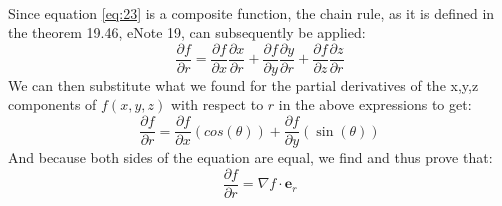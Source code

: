 \documentclass{article}
\begin{document}
\\
Since equation \ref{eq:23} is a composite function, the chain rule, as it is defined in the theorem 19.46, eNote 19, can subsequently be applied:
\begin{equation}
\frac{\partial f}{\partial r} = \frac{\partial f}{\partial x}\frac{\partial x}{\partial r}+\frac{\partial f}{\partial y}\frac{\partial y}{\partial r}+\frac{\partial f}{\partial z}\frac{\partial z}{\partial r}
\end{equation}
We can then substitute what we found for the partial derivatives of the x,y,z components of $f(x,y,z)$ with respect to $r$ in the above expressions to get: 
\begin{equation}
    \frac{\partial f}{\partial r} = \frac{\partial f}{\partial x}(cos(\theta))+\frac{\partial f}{\partial y}(\sin(\theta))
\end{equation}
And because both sides of the equation are equal, we find and thus prove that:
\begin{equation}
    \frac{\partial f}{\partial r} = \nabla f \cdot \mathbf{e}_r
\end{equation}
\end{document}
